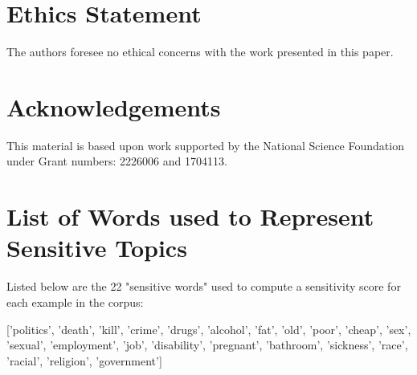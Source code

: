 \documentclass[11pt]{article}
\begin{document}
\section*{Ethics Statement}
The authors foresee no ethical concerns with the
work presented in this paper.

\section*{Acknowledgements} %
This material is based upon work supported by the National Science Foundation under Grant  numbers: 2226006 and 1704113.




\newpage
\onecolumn
\appendix
\section{List of Words used to Represent Sensitive Topics}
\bigskip
Listed below are the 22 "sensitive words" used to compute a sensitivity score for each example in the corpus:

\bigskip
\noindent
\label{sec:appendix_a}
['politics', 'death', 'kill', 'crime', 'drugs', 'alcohol', 'fat', 'old', 'poor', 'cheap', 'sex', 'sexual', 'employment', 'job', 'disability', 'pregnant', 'bathroom', 'sickness', 'race', 'racial', 'religion', 'government']


\end{document}
